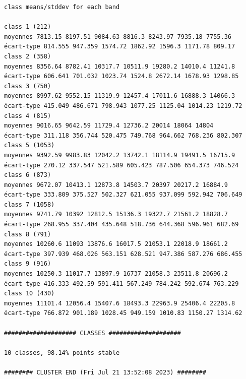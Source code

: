 \documentclass[environments,article,submit,pdftex,moreauthors]{Definitions/mdpi}
\begin{document}
\begin{scriptsize}
\begin{verbatim}
class means/stddev for each band

class 1 (212)
moyennes 7813.15 8197.51 9084.63 8816.3 8243.97 7935.18 7755.36
écart-type 814.555 947.359 1574.72 1862.92 1596.3 1171.78 809.17
class 2 (358)
moyennes 8356.64 8782.41 10317.7 10511.9 19280.2 14010.4 11241.8
écart-type 606.641 701.032 1023.74 1524.8 2672.14 1678.93 1298.85
class 3 (750)
moyennes 8997.62 9552.15 11319.9 12457.4 17011.6 16888.3 14066.3
écart-type 415.049 486.671 798.943 1077.25 1125.04 1014.23 1219.72
class 4 (815)
moyennes 9016.65 9642.59 11729.4 12736.2 20014 18064 14804
écart-type 311.118 356.744 520.475 749.768 964.662 768.236 802.307
class 5 (1053)
moyennes 9392.59 9983.83 12042.2 13742.1 18114.9 19491.5 16715.9
écart-type 270.12 337.547 521.589 605.423 787.506 654.373 746.524
class 6 (873)
moyennes 9672.07 10413.1 12873.8 14503.7 20397 20217.2 16884.9
écart-type 333.809 375.527 502.327 621.055 937.099 592.942 706.649
class 7 (1058)
moyennes 9741.79 10392 12812.5 15136.3 19322.7 21561.2 18828.7
écart-type 268.955 337.404 435.648 518.736 644.368 596.961 682.69
class 8 (791)
moyennes 10260.6 11093 13876.6 16017.5 21053.1 22018.9 18661.2
écart-type 397.939 468.026 563.151 628.521 947.386 587.276 686.455
class 9 (916)
moyennes 10250.3 11017.7 13897.9 16737 21058.3 23511.8 20696.2
écart-type 416.333 492.59 591.411 567.249 784.242 592.674 763.229
class 10 (430)
moyennes 11101.4 12056.4 15407.6 18493.3 22963.9 25406.4 22205.8
écart-type 766.872 901.189 1028.45 949.159 1010.83 1150.27 1314.62

#################### CLASSES ####################

10 classes, 98.14% points stable

######## CLUSTER END (Fri Jul 21 13:52:08 2023) ########

\end{verbatim}
\end{scriptsize}
\end{document}
